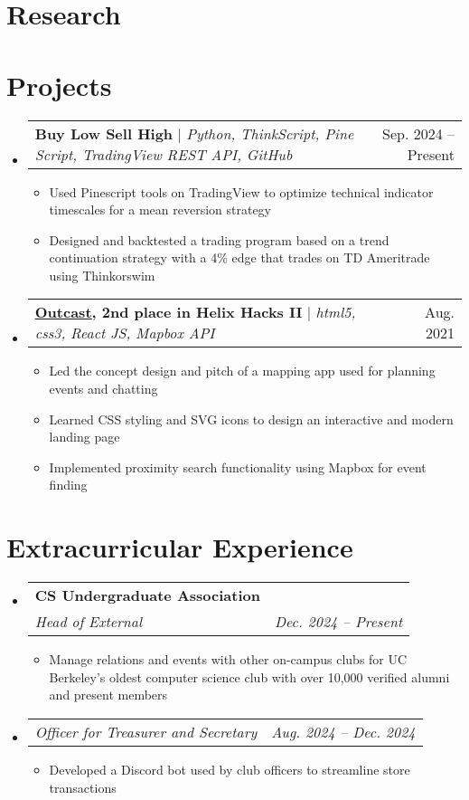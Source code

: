 \documentclass[letterpaper,11pt]{article}
\makeatletter
\newcommand{\resumeItem}[1]{
  \item\small{
    {#1 \vspace{-2pt}}
  }
}
\newcommand{\resumeSubheading}[4]{
  \vspace{-2pt}\item
    \begin{tabular*}{0.97\textwidth}[t]{l@{\extracolsep{\fill}}r}
      \textbf{#1} & #2 \\
      \textit{\small#3} & \textit{\small #4} \\
    \end{tabular*}\vspace{-7pt}
}
\newcommand{\resumeSubSubheading}[2]{
    \item
    \begin{tabular*}{0.97\textwidth}{l@{\extracolsep{\fill}}r}
      \textit{\small#1} & \textit{\small #2} \\
    \end{tabular*}\vspace{-7pt}
}
\newcommand{\resumeProjectHeading}[2]{
    \item
    \begin{tabular*}{0.97\textwidth}{l@{\extracolsep{\fill}}r}
      \small#1 & #2 \\
    \end{tabular*}\vspace{-7pt}
}
\newcommand{\resumeSubHeadingListStart}{\begin{itemize}[leftmargin=0.15in, label={}]}
\newcommand{\resumeSubHeadingListEnd}{\end{itemize}}
\newcommand{\resumeItemListStart}{\begin{itemize}}
\newcommand{\resumeItemListEnd}{\end{itemize}\vspace{-5pt}}
\makeatother
\begin{document}
\section{Research}

\section{Projects}
    \resumeSubHeadingListStart
      \resumeProjectHeading
          {\textbf{Buy Low Sell High} $|$ \emph{Python, ThinkScript, Pine Script, TradingView REST API, GitHub}}{Sep. 2024 -- Present}
          \resumeItemListStart
            \resumeItem{Used Pinescript tools on TradingView to optimize technical indicator timescales for a mean reversion strategy}
            \resumeItem{Designed and backtested a trading program based on a trend continuation strategy with a 4\% edge that trades on TD Ameritrade using Thinkorswim} %
          \resumeItemListEnd
      \resumeProjectHeading
          {\textbf{\href{https://devpost.com/software/outcast-bfs3lh}{\underline{Outcast}}, 2nd place in Helix Hacks II} $|$ \emph{html5, css3, React JS, Mapbox API}}{Aug. 2021}
          \resumeItemListStart
            \resumeItem{Led the concept design and pitch of a mapping app used for planning events and chatting}
            \resumeItem{Learned CSS styling and SVG icons to design an interactive and modern landing page}
            \resumeItem{Implemented proximity search functionality using Mapbox for event finding}

          \resumeItemListEnd
    \resumeSubHeadingListEnd
\section{Extracurricular Experience}
  \resumeSubHeadingListStart
    \resumeSubheading
      {CS Undergraduate Association}{}
      {Head of External}{Dec. 2024 -- Present}
      \resumeItemListStart
        \resumeItem{Manage relations and events with other on-campus clubs for UC Berkeley's oldest computer science club with over 10,000 verified alumni and present members}
      \resumeItemListEnd
       \resumeSubSubheading
     {Officer for Treasurer and Secretary }{Aug. 2024 -- Dec. 2024}
     \resumeItemListStart
        \resumeItem{Developed a Discord bot used by club officers to streamline store transactions}
     \resumeItemListEnd
\resumeSubHeadingListEnd
%
\end{document}
